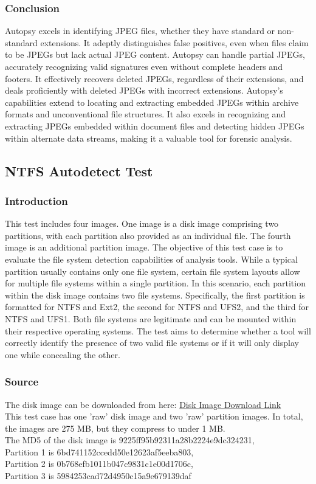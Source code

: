 \documentclass{article}
\begin{document}
\subsubsection*{Conclusion}
Autopsy excels in identifying JPEG files, whether they have standard or non-standard extensions. It adeptly distinguishes false positives, even when files claim to be JPEGs but lack actual JPEG content. Autopsy can handle partial JPEGs, accurately recognizing valid signatures even without complete headers and footers. It effectively recovers deleted JPEGs, regardless of their extensions, and deals proficiently with deleted JPEGs with incorrect extensions. Autopsy's capabilities extend to locating and extracting embedded JPEGs within archive formats and unconventional file structures. It also excels in recognizing and extracting JPEGs embedded within document files and detecting hidden JPEGs within alternate data streams, making it a valuable tool for forensic analysis.

\subsection{NTFS Autodetect Test}
\subsubsection*{Introduction}
This test includes four images. One image is a disk image comprising two partitions, with each partition also provided as an individual file. The fourth image is an additional partition image. The objective of this test case is to evaluate the file system detection capabilities of analysis tools. While a typical partition usually contains only one file system, certain file system layouts allow for multiple file systems within a single partition. In this scenario, each partition within the disk image contains two file systems. Specifically, the first partition is formatted for NTFS and Ext2, the second for NTFS and UFS2, and the third for NTFS and UFS1. Both file systems are legitimate and can be mounted within their respective operating systems. The test aims to determine whether a tool will correctly identify the presence of two valid file systems or if it will only display one while concealing the other.
\subsubsection*{Source}
The disk image can be downloaded from here:
\href{http://prdownloads.sourceforge.net/dftt/10b-ntfs-autodetect.zip?download}{Disk Image Download Link} \\
This test case has one ’raw’ disk image and two ’raw’ partition images. In total, the images are 275 MB, but they compress to under 1 MB.\\
The MD5 of the disk image is 9225ff95b92311a28b2224e9dc324231,\\
Partition 1 is 6bd741152ccedd50e12623af5eeba803,\\
Partition 2 is 0b768efb1011b047c9831c1e00d1706c,\\ Partition 3 is 5984253cad72d4950c15a9e679139daf
\end{document}
